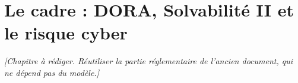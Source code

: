 \chapter{Le cadre : DORA, Solvabilité II et le risque cyber}
\label{ch:contexte}

\textit{[Chapitre à rédiger. Réutiliser la partie réglementaire de l'ancien document,
qui ne dépend pas du modèle.]}

